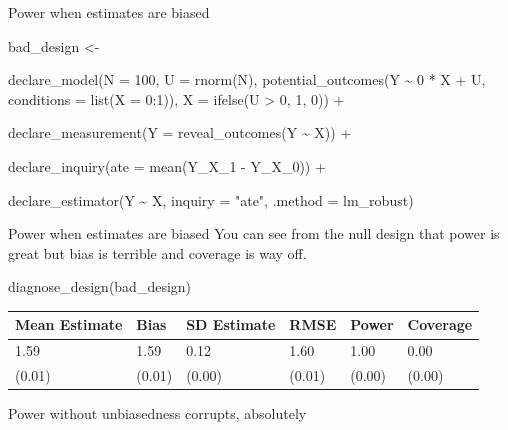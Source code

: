 \documentclass[
  11pt,
  ignorenonframetext,
]{beamer}
\newenvironment{Shaded}{\begin{snugshade}}{\end{snugshade}}
\newcommand{\AttributeTok}[1]{\textcolor[rgb]{0.40,0.45,0.13}{#1}}
\newcommand{\DecValTok}[1]{\textcolor[rgb]{0.68,0.00,0.00}{#1}}
\newcommand{\FunctionTok}[1]{\textcolor[rgb]{0.28,0.35,0.67}{#1}}
\newcommand{\NormalTok}[1]{\textcolor[rgb]{0.00,0.23,0.31}{#1}}
\newcommand{\OtherTok}[1]{\textcolor[rgb]{0.00,0.23,0.31}{#1}}
\newcommand{\SpecialCharTok}[1]{\textcolor[rgb]{0.37,0.37,0.37}{#1}}
\newcommand{\StringTok}[1]{\textcolor[rgb]{0.13,0.47,0.30}{#1}}
\begin{document}
\begin{frame}[fragile]{Power when estimates are biased}
\protect\hypertarget{power-when-estimates-are-biased}{}
\begin{Shaded}
\begin{Highlighting}[]
\NormalTok{bad\_design }\OtherTok{\textless{}{-}} 
  
  \FunctionTok{declare\_model}\NormalTok{(}\AttributeTok{N =} \DecValTok{100}\NormalTok{, }
    \AttributeTok{U =} \FunctionTok{rnorm}\NormalTok{(N),}
    \FunctionTok{potential\_outcomes}\NormalTok{(Y }\SpecialCharTok{\textasciitilde{}} \DecValTok{0} \SpecialCharTok{*}\NormalTok{ X }\SpecialCharTok{+}\NormalTok{ U, }\AttributeTok{conditions =} \FunctionTok{list}\NormalTok{(}\AttributeTok{X =} \DecValTok{0}\SpecialCharTok{:}\DecValTok{1}\NormalTok{)),}
    \AttributeTok{X =} \FunctionTok{ifelse}\NormalTok{(U }\SpecialCharTok{\textgreater{}} \DecValTok{0}\NormalTok{, }\DecValTok{1}\NormalTok{, }\DecValTok{0}\NormalTok{)) }\SpecialCharTok{+} 
  
  \FunctionTok{declare\_measurement}\NormalTok{(}\AttributeTok{Y =} \FunctionTok{reveal\_outcomes}\NormalTok{(Y }\SpecialCharTok{\textasciitilde{}}\NormalTok{ X)) }\SpecialCharTok{+} 
  
  \FunctionTok{declare\_inquiry}\NormalTok{(}\AttributeTok{ate =} \FunctionTok{mean}\NormalTok{(Y\_X\_1 }\SpecialCharTok{{-}}\NormalTok{ Y\_X\_0)) }\SpecialCharTok{+} 
  
  \FunctionTok{declare\_estimator}\NormalTok{(Y }\SpecialCharTok{\textasciitilde{}}\NormalTok{ X, }\AttributeTok{inquiry =} \StringTok{"ate"}\NormalTok{, }\AttributeTok{.method =}\NormalTok{ lm\_robust)}
\end{Highlighting}
\end{Shaded}
\end{frame}

\begin{frame}[fragile]{Power when estimates are biased}
\protect\hypertarget{power-when-estimates-are-biased-1}{}
You can see from the null design that power is great but bias is
terrible and coverage is way off.

\begin{Shaded}
\begin{Highlighting}[]
\FunctionTok{diagnose\_design}\NormalTok{(bad\_design)}
\end{Highlighting}
\end{Shaded}

\begin{tabular}{l|l|l|l|l|l}
\hline
Mean Estimate & Bias & SD Estimate & RMSE & Power & Coverage\\
\hline
1.59 & 1.59 & 0.12 & 1.60 & 1.00 & 0.00\\
\hline
(0.01) & (0.01) & (0.00) & (0.01) & (0.00) & (0.00)\\
\hline
\end{tabular}

Power without unbiasedness corrupts, absolutely
\end{frame}
\end{document}
